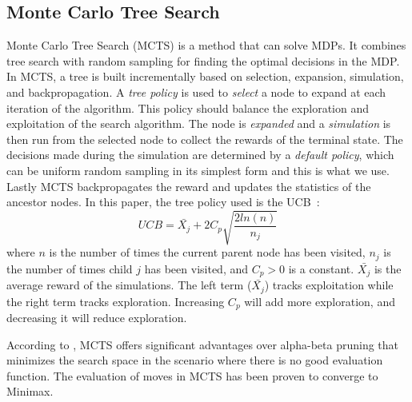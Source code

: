 \subsection{Monte Carlo Tree Search}
Monte Carlo Tree Search (MCTS) is a method that can solve MDPs. It combines tree search with random sampling for finding the optimal decisions in the MDP. In MCTS, a tree is built incrementally based on selection, expansion, simulation, and backpropagation. 
A \textit{tree policy} is used to \textit{select} a node to expand at each iteration of the algorithm. This policy should balance the exploration and exploitation of the search algorithm. The node is \textit{expanded} and a \textit{simulation} is then run from the selected node to collect the rewards of the terminal state. The decisions made during the simulation are determined by a \textit{default policy}, which can be uniform random sampling in its simplest form and this is what we use. Lastly MCTS backpropagates the reward and updates the statistics of the ancestor nodes. In this paper, the tree policy used is the UCB~\cite{auer2002finite}:
\begin{equation}
    UCB = \bar{X_j} + 2C_p\sqrt{\frac{2ln(n)}{n_j}}
\end{equation}
where $n$ is the number of times the current parent node has been visited, $n_j$ is the number of times child $j$ has been visited, and $C_p>0$ is a constant. $\bar{X_j}$ is the average reward of the simulations. The left term ($\bar{X_j}$) tracks exploitation while the right term tracks exploration. Increasing $C_p$ will add more exploration, and decreasing it will reduce exploration.

According to \cite{jakl2011arimaa}, MCTS offers significant advantages over alpha-beta pruning that minimizes the search space in the scenario where there is no good evaluation function. The evaluation of moves in MCTS has been proven to converge to Minimax.



